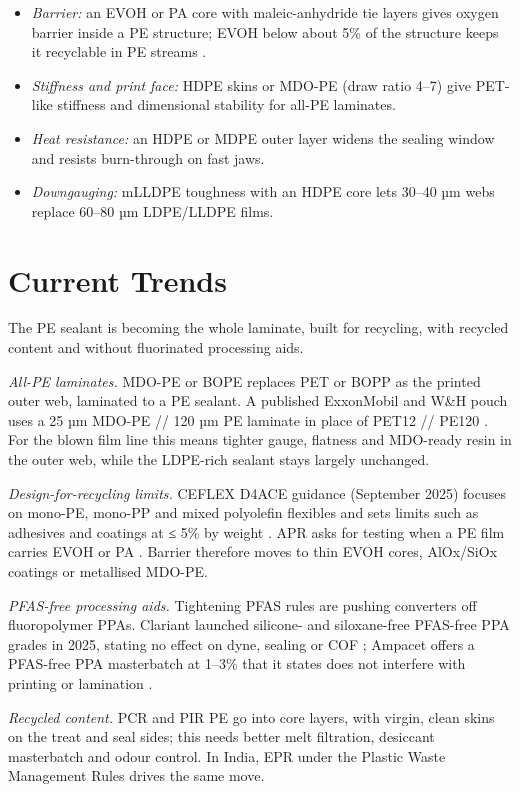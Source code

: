 \documentclass[10pt,twocolumn,a4paper]{article}
\begin{document}
\begin{itemize}\setlength\itemsep{1pt}
\item \textit{Barrier:} an EVOH or PA core with maleic-anhydride tie layers gives oxygen barrier inside a PE structure; EVOH below about 5\% of the structure keeps it recyclable in PE streams \cite{ceflex}.
\item \textit{Stiffness and print face:} HDPE skins or MDO-PE (draw ratio 4–7) give PET-like stiffness and dimensional stability for all-PE laminates.
\item \textit{Heat resistance:} an HDPE or MDPE outer layer widens the sealing window and resists burn-through on fast jaws.
\item \textit{Downgauging:} mLLDPE toughness with an HDPE core lets 30–40 µm webs replace 60–80 µm LDPE/LLDPE films.
\end{itemize}

\section{Current Trends}

The PE sealant is becoming the whole laminate, built for recycling, with recycled content and without fluorinated processing aids.

\textit{All-PE laminates.} MDO-PE or BOPE replaces PET or BOPP as the printed outer web, laminated to a PE sealant. A published ExxonMobil and W\&H pouch uses a 25 µm MDO-PE // 120 µm PE laminate in place of PET12 // PE120 \cite{wh}. For the blown film line this means tighter gauge, flatness and MDO-ready resin in the outer web, while the LDPE-rich sealant stays largely unchanged.

\textit{Design-for-recycling limits.} CEFLEX D4ACE guidance (September 2025) focuses on mono-PE, mono-PP and mixed polyolefin flexibles and sets limits such as adhesives and coatings at ≤ 5\% by weight \cite{ceflex}. APR asks for testing when a PE film carries EVOH or PA \cite{pe2023}. Barrier therefore moves to thin EVOH cores, AlOx/SiOx coatings or metallised MDO-PE.

\textit{PFAS-free processing aids.} Tightening PFAS rules are pushing converters off fluoropolymer PPAs. Clariant launched silicone- and siloxane-free PFAS-free PPA grades in 2025, stating no effect on dyne, sealing or COF \cite{clariant}; Ampacet offers a PFAS-free PPA masterbatch at 1–3\% that it states does not interfere with printing or lamination \cite{ampacet}.

\textit{Recycled content.} PCR and PIR PE go into core layers, with virgin, clean skins on the treat and seal sides; this needs better melt filtration, desiccant masterbatch and odour control. In India, EPR under the Plastic Waste Management Rules drives the same move.
\end{document}
